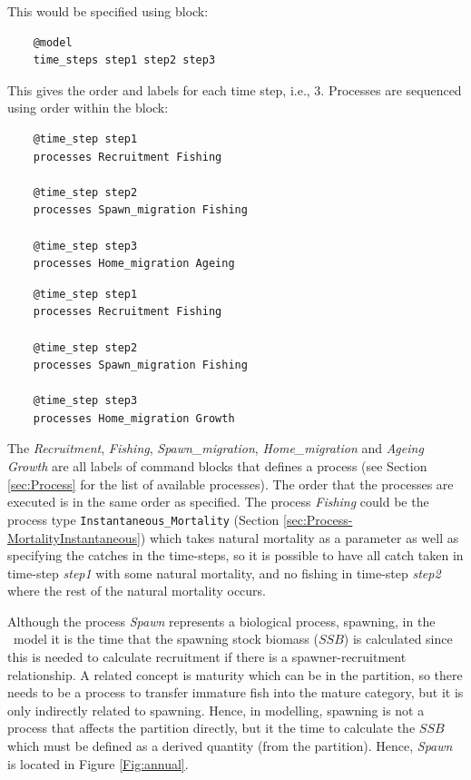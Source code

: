 This would be specified using  block:

{\small{\begin{verbatim}
	@model
	time_steps step1 step2 step3
\end{verbatim}}}

This gives the order and labels for each time step, i.e., 3. Processes are sequenced using order within the  block:

\ifAgeBased
{\small{\begin{verbatim}
	@time_step step1
	processes Recruitment Fishing
	
	@time_step step2
	processes Spawn_migration Fishing
	
	@time_step step3
	processes Home_migration Ageing
\end{verbatim}}}
\else
{\small{\begin{verbatim}
	@time_step step1
	processes Recruitment Fishing
	
	@time_step step2
	processes Spawn_migration Fishing
	
	@time_step step3
	processes Home_migration Growth
\end{verbatim}}}
\fi

The \emph{Recruitment}, \emph{Fishing}, \emph{Spawn\_migration}, \emph{Home\_migration} and \ifAgeBased \emph{Ageing} \else \emph{Growth} \fi are all labels of command blocks that defines a process (see Section \ref{sec:Process} for the list of available processes). The order that the  processes are executed is in the same order as specified. The process \emph{Fishing} could be the process type \texttt{Instantaneous\_Mortality} (Section \ref{sec:Process-MortalityInstantaneous}) which takes natural mortality as a parameter as well as specifying the catches in the time-steps, so it is possible to have all catch taken in time-step \emph{step1} with some natural mortality, and no fishing in time-step \emph{step2} where the rest of the natural mortality occurs.

Although the process \emph{Spawn} represents a biological process, spawning, in the \CNAME\ model it is the time that the spawning stock biomass ($SSB$) is calculated since this is needed to calculate recruitment if there is a spawner-recruitment relationship. A related concept is maturity which can be in the partition, so there needs to be a process to transfer immature fish into the mature category, but it is only indirectly related to spawning. Hence, in modelling, spawning is not a process that affects the partition directly, but it the time to calculate the $SSB$ which must be defined as a derived quantity (from the partition). Hence, \emph{Spawn} is located in Figure \ref{Fig:annual}.

